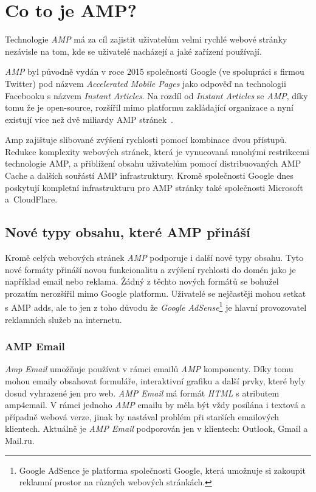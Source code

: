 \chapter{Co to je AMP?}
\label{AMP}
Technologie \emph{AMP} má za cíl zajistit uživatelům velmi rychlé webové stránky nezávisle na tom, kde se
uživatelé nacházejí a jaké zařízení používají.

\emph{AMP} byl původně vydán v roce 2015 společností Google (ve spolupráci s firmou Twitter) pod názvem \emph{Accelerated Mobile Pages} jako odpověď
na technologii Facebooku s názvem \emph{Instant Articles}. Na rozdíl od \emph{Instant Articles} se \emph{AMP}, díky tomu že je
open-source, rozšířil mimo platformu zakládající organizace a nyní existují více než dvě miliardy AMP
stránek~\cite{AMPTurbo}.

Amp zajištuje slibované zvýšení rychlosti pomocí kombinace dvou přístupů. Redukce komplexity webových stránek, která je vynucovaná mnohými restrikcemi technologie AMP, a přiblížení obsahu uživatelům pomocí distribuovaných AMP Cache a dalších souřástí AMP infrastruktury. Kromě společnosti Google dnes poskytují kompletní infrastrukturu pro AMP stránky také
společnosti Microsoft a~CloudFlare.

\section{Nové typy obsahu, které AMP přináší}
Kromě celých webových stránek \emph{AMP} podporuje i další nové typy obsahu. Tyto nové formáty přináší novou funkcionalitu a zvýšení rychlosti do domén jako je například email nebo reklama. Žádný z těchto nových formátů se bohužel prozatím nerozšířil mimo Google platformu. Uživatelé se nejčastěji mohou setkat s AMP adds, ale to jen z toho důvodu že \emph{Google AdSense}\footnote{Google AdSence je platforma společnosti Google, která umožnuje si zakoupit reklamní prostor na různých webových stránkách.} je hlavní provozovatel reklamních služeb na internetu.
\subsection*{AMP Email}
\emph{Amp Email} umožňuje používat v rámci emailů \emph{AMP} komponenty. Díky tomu mohou emaily obsahovat formuláře, interaktivní grafiku a další prvky, které byly dosud vyhrazené jen pro web. \emph{AMP Email} má formát \emph{HTML} s atributem amp4email. V rámci jednoho \emph{AMP} emailu by měla být vždy posílána i textová a případně webová verze, jinak by nastával problém při starších emailových klientech\cite[Ch.\ 6, p.\ 285]{VzhuruDoAMP}.
Aktuálně je \emph{AMP Email} podporován jen v klientech:
Outlook, Gmail a Mail.ru\cite{EmailSupport}.
